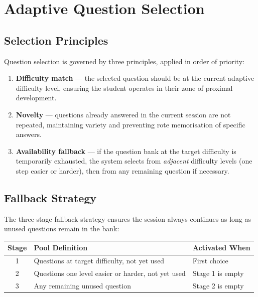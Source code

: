 \documentclass[12pt,a4paper]{article}
\begin{document}
\section{Adaptive Question Selection}

\subsection{Selection Principles}

Question selection is governed by three principles, applied in order of
priority:

\begin{enumerate}[leftmargin=2em, itemsep=4pt]
  \item \textbf{Difficulty match} — the selected question should be at the
        current adaptive difficulty level, ensuring the student operates in
        their zone of proximal development.
  \item \textbf{Novelty} — questions already answered in the current session
        are not repeated, maintaining variety and preventing rote memorisation
        of specific answers.
  \item \textbf{Availability fallback} — if the question bank at the target
        difficulty is temporarily exhausted, the system selects from
        \emph{adjacent} difficulty levels (one step easier or harder), then
        from any remaining question if necessary.
\end{enumerate}

\subsection{Fallback Strategy}

The three-stage fallback strategy ensures the session always continues as
long as unused questions remain in the bank:

\begin{center}
\begin{tabular}{cll}
  \toprule
  \textbf{Stage} & \textbf{Pool Definition} & \textbf{Activated When} \\
  \midrule
  1 & Questions at target difficulty, not yet used & First choice \\
  2 & Questions one level easier or harder, not yet used & Stage 1 is empty \\
  3 & Any remaining unused question & Stage 2 is empty \\
  \bottomrule
\end{tabular}
\end{center}
\end{document}
